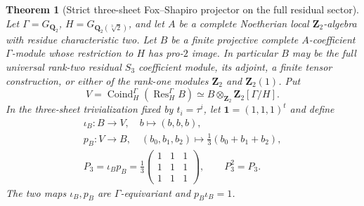 \documentclass[11pt]{article}
\newtheorem{theorem}{Theorem}[section]
\theoremstyle{definition}
\begin{document}
\begin{theorem}[Strict three-sheet Fox--Shapiro projector on the full residual sector]
\label{thm:dyadic-f134-strict-hecke-coinduced-chain}
Let
$\Gamma=G_{\mathbf Q_2}$,
$H=G_{\mathbf Q_2(\sqrt[3]2)}$,
and let $A$ be a complete
Noetherian local
$\mathbf Z_2$-algebra
with residue
characteristic two.
Let $B$ be a finite
projective complete
$A$-coefficient
$\Gamma$-module whose
restriction to $H$
has pro-$2$ image.
In particular $B$
may be the full
universal rank-two
residual $S_3$
coefficient module,
its adjoint, a
finite tensor
construction, or
either of the
rank-one modules
$\mathbf Z_2$ and
$\mathbf Z_2(1)$.
Put
\begin{equation}\label{eq:dyadic-f134-coinduced-permutation-bundle}
V=\operatorname{Coind}_H^\Gamma
(\operatorname{Res}_H^\Gamma B)
\simeq B\otimes_{\mathbf Z_2}
\mathbf Z_2[\Gamma/H].
\end{equation}
In the three-sheet
trivialization
fixed by $t_i=\tau^i$,
let $\mathbf1=(1,1,1)^t$
and define
\begin{equation}\label{eq:dyadic-f134-average-three-sheet}
\boxed{
\begin{gathered}
\iota_B:B\longrightarrow V,\quad
b\longmapsto (b,b,b),\\
p_B:V\longrightarrow B,\quad
(b_0,b_1,b_2)
\longmapsto\tfrac13(b_0+b_1+b_2),\\
P_3=\iota_Bp_B=
\frac13
\begin{pmatrix}
1&1&1\\
1&1&1\\
1&1&1
\end{pmatrix},
\qquad P_3^2=P_3.
\end{gathered}}
\end{equation}
The two maps
$\iota_B,p_B$ are
\emph{$\Gamma$-equivariant}
and $p_B\iota_B=1$.


\end{theorem}
\end{document}
